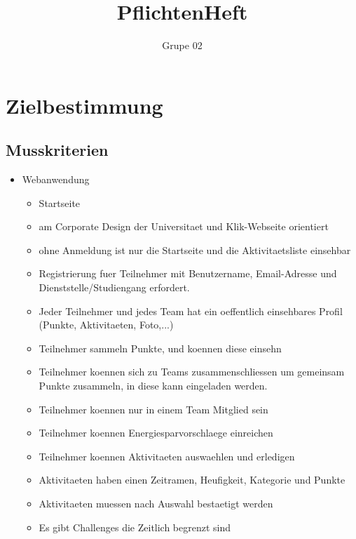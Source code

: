 \documentclass[10pt,a4paper]{article}
\author{Grupe 02}
\title{PflichtenHeft}
\begin{document}
\maketitle
\tableofcontents
\section{Zielbestimmung}
	\subsection{Musskriterien}
	\begin{itemize}
		\item Webanwendung
		\begin{itemize}
			\item Startseite
			\item am Corporate Design der Universitaet und Klik-Webseite orientiert
			\item ohne Anmeldung ist nur die Startseite und die Aktivitaetsliste einsehbar
			\item Registrierung fuer Teilnehmer mit Benutzername, Email-Adresse und Dienststelle/Studiengang erfordert.
			\item Jeder Teilnehmer und jedes Team hat ein oeffentlich einsehbares Profil (Punkte, Aktivitaeten, Foto,...) %
			\item Teilnehmer sammeln Punkte, und koennen diese einsehn
			\item Teilnehmer koennen sich zu Teams zusammenschliessen um gemeinsam Punkte zusammeln, in diese kann eingeladen werden.
			\item Teilnehmer koennen nur in einem Team Mitglied sein
			\item Teilnehmer koennen Energiesparvorschlaege einreichen
			\item Teilnehmer koennen Aktivitaeten auswaehlen und erledigen
			\item Aktivitaeten haben einen Zeitramen, Heufigkeit, Kategorie und Punkte
			\item Aktivitaeten muessen nach Auswahl bestaetigt werden
			\item Es gibt Challenges die Zeitlich begrenzt sind
			

\end{itemize}
\end{itemize}
\end{document}
